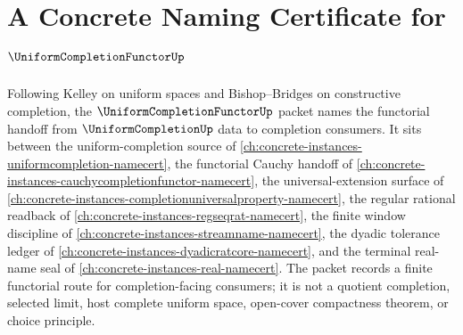 \chapter{A Concrete Naming Certificate for $\UniformCompletionFunctorUp$}
\label{ch:concrete-instances-uniformcompletionfunctor-namecert}

Following Kelley on uniform spaces and Bishop--Bridges on constructive completion, the $\UniformCompletionFunctorUp$ packet names the functorial handoff from $\UniformCompletionUp$ data to completion consumers. It sits between the uniform-completion source of \autoref{ch:concrete-instances-uniformcompletion-namecert}, the functorial Cauchy handoff of \autoref{ch:concrete-instances-cauchycompletionfunctor-namecert}, the universal-extension surface of \autoref{ch:concrete-instances-completionuniversalproperty-namecert}, the regular rational readback of \autoref{ch:concrete-instances-regseqrat-namecert}, the finite window discipline of \autoref{ch:concrete-instances-streamname-namecert}, the dyadic tolerance ledger of \autoref{ch:concrete-instances-dyadicratcore-namecert}, and the terminal real-name seal of \autoref{ch:concrete-instances-real-namecert}. The packet records a finite functorial route for completion-facing consumers; it is not a quotient completion, selected limit, host complete uniform space, open-cover compactness theorem, or choice principle.

